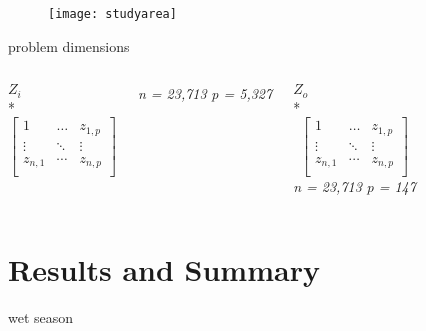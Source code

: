 \documentclass{beamer}
\begin{document}
\begin{frame}
\begin{figure}
\vspace{0.0cm} \texttt{[image: studyarea]}
\end{figure}
\end{frame}

\begin{frame}{problem dimensions}
\begin{columns}[c]
\column{2.5in}
\center \textbf{$Z_i$}\\*
\begin{equation*}
\left[ 
\begin{matrix}
   1 & \ldots  & {{z}_{1,p}}  \\
   \vdots  & \ddots  & \vdots   \\
   {{z}_{n,1}} & \cdots  & {{z}_{n,p}}  \\
\end{matrix} 
\right]
\end{equation*}

\center \textit{n = 23,713}
\center \textit{p =  5,327}

\column{2.5in}

\center \textbf{$Z_o$}\\*
\begin{equation*}
\left[ 
\begin{matrix}
   1 & \ldots  & {{z}_{1,p}}  \\
   \vdots  & \ddots  & \vdots   \\
   {{z}_{n,1}} & \cdots  & {{z}_{n,p}}  \\
\end{matrix} 
\right]
\end{equation*}
\center \textit{n = 23,713}
\center \textit{p =  147}

\end{columns}
\end{frame}


\section{Results and Summary}
\begin{frame}{wet season}
\begin{figure}
\begin{center}
\end{center}
\end{figure}
\end{frame}
\end{document}
